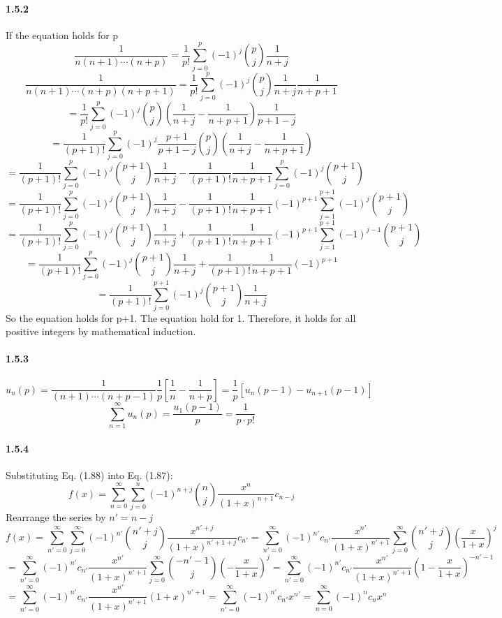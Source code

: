 \documentclass[a4paper]{article}
\begin{document}
\paragraph{1.5.2}
If the equation holds for p
\[\frac{1}{n(n+1)\cdots(n+p)}=\frac{1}{p!}\sum_{j=0}^p (-1)^j \binom{p}{j}\frac{1}{n+j}\]
\[\frac{1}{n(n+1)\cdots(n+p)(n+p+1)}=\frac{1}{p!}\sum_{j=0}^p (-1)^j \binom{p}{j}\frac{1}{n+j}\frac{1}{n+p+1}\]
\[=\frac{1}{p!}\sum_{j=0}^p (-1)^j \binom{p}{j}\left(\frac{1}{n+j}-\frac{1}{n+p+1}\right)\frac{1}{p+1-j}\]
\[=\frac{1}{(p+1)!}\sum_{j=0}^p (-1)^j\frac{p+1}{p+1-j} \binom{p}{j}\left(\frac{1}{n+j}-\frac{1}{n+p+1}\right)\]
\[=\frac{1}{(p+1)!}\sum_{j=0}^p(-1)^j\binom{p+1}{j}\frac{1}{n+j}-\frac{1}{(p+1)!}\frac{1}{n+p+1}\sum_{j=0}^p(-1)^j\binom{p+1}{j}\]
\[=\frac{1}{(p+1)!}\sum_{j=0}^p(-1)^j\binom{p+1}{j}\frac{1}{n+j}-\frac{1}{(p+1)!}\frac{1}{n+p+1}(-1)^{p+1}\sum_{j=1}^{p+1}(-1)^{j}\binom{p+1}{j}\]
\[=\frac{1}{(p+1)!}\sum_{j=0}^p(-1)^j\binom{p+1}{j}\frac{1}{n+j}+\frac{1}{(p+1)!}\frac{1}{n+p+1}(-1)^{p+1}\sum_{j=1}^{p+1}(-1)^{j-1}\binom{p+1}{j}\]
\[=\frac{1}{(p+1)!}\sum_{j=0}^p(-1)^j\binom{p+1}{j}\frac{1}{n+j}+\frac{1}{(p+1)!}\frac{1}{n+p+1}(-1)^{p+1}\]
\[=\frac{1}{(p+1)!}\sum_{j=0}^{p+1}(-1)^j\binom{p+1}{j}\frac{1}{n+j}\]
So the equation holds for p+1. The equation hold for 1. Therefore, it holds for all positive integers by mathematical induction.

\paragraph{1.5.3}
\[u_n(p)=\frac{1}{(n+1)\cdots(n+p-1)}\frac{1}{p}\left[\frac{1}{n}-\frac{1}{n+p} \right]=\frac{1}{p}\left[u_n(p-1)-u_{n+1}(p-1) \right]\]
\[\sum_{n=1}^\infty u_n(p)=\frac{u_1(p-1)}{p}=\frac{1}{p\cdot p!}\]

\paragraph{1.5.4}
Substituting Eq. (1.88) into Eq. (1.87):
\[f(x)=\sum_{n=0}^\infty\sum_{j=0}^n(-1)^{n+j}\binom{n}{j}\frac{x^n}{(1+x)^{n+1}}c_{n-j}\]
Rearrange the series by $n'=n-j$
\[f(x)=\sum_{n'=0}^\infty\sum_{j=0}^\infty(-1)^{n'}\binom{n'+j}{j}\frac{x^{n'+j}}{(1+x)^{n'+1+j}}c_{n'}
=\sum_{n'=0}^\infty(-1)^{n'}c_{n'}\frac{x^{n'}}{(1+x)^{n'+1}}\sum_{j=0}^\infty\binom{n'+j}{j}\left(\frac{x}{1+x} \right)^j\]
\[=\sum_{n'=0}^\infty(-1)^{n'}c_{n'}\frac{x^{n'}}{(1+x)^{n'+1}}\sum_{j=0}^\infty\binom{-n'-1}{j}\left(-\frac{x}{1+x} \right)^j =\sum_{n'=0}^\infty(-1)^{n'}c_{n'}\frac{x^{n'}}{(1+x)^{n'+1}}\left(1-\frac{x}{1+x} \right)^{-n'-1}\]
\[=\sum_{n'=0}^\infty(-1)^{n'}c_{n'}\frac{x^{n'}}{(1+x)^{n'+1}}(1+x)^{n'+1}=\sum_{n'=0}^\infty(-1)^{n'}c_{n'}x^{n'}=\sum_{n=0}^\infty(-1)^{n}c_{n}x^{n}\]
\end{document}
